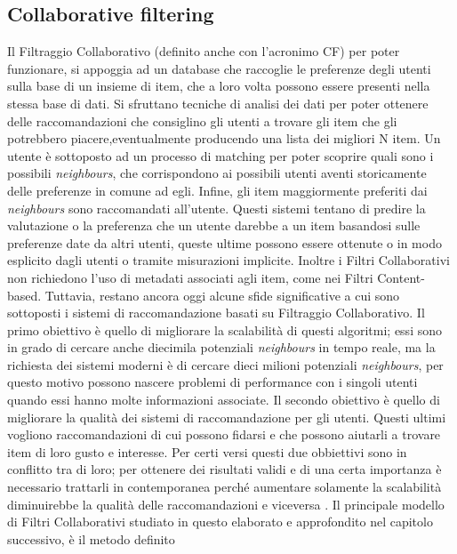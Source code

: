 \subsection{Collaborative filtering}
Il Filtraggio Collaborativo (definito anche con l'acronimo CF) per poter funzionare, si appoggia ad un database che raccoglie le 
preferenze degli utenti sulla base di un insieme di item, che a loro volta possono essere presenti nella stessa base di dati. 
Si sfruttano tecniche di analisi dei dati per poter ottenere delle raccomandazioni che consiglino gli utenti a trovare gli item 
che gli potrebbero piacere,eventualmente producendo una lista dei migliori N item.\hfill\break
Un utente è sottoposto ad un processo di matching per poter scoprire quali sono i possibili \textit{neighbours}, 
che corrispondono ai possibili utenti aventi storicamente delle preferenze in comune ad egli. Infine, gli item maggiormente 
preferiti dai \textit{neighbours} sono raccomandati all'utente.\hfill\break
Questi sistemi tentano di predire la valutazione o la preferenza che un utente darebbe a un item basandosi sulle preferenze date da altri 
utenti, queste ultime possono essere ottenute o in modo esplicito dagli utenti o tramite misurazioni implicite. 
Inoltre i Filtri Collaborativi non richiedono l'uso di metadati associati agli item, come nei Filtri Content-based.\hfill\break
Tuttavia, restano ancora oggi alcune sfide significative a cui sono sottoposti i sistemi di raccomandazione basati su 
Filtraggio Collaborativo.\hfill\break
Il primo obiettivo è quello di migliorare la scalabilità di questi algoritmi; essi sono in grado di cercare 
anche diecimila potenziali \textit{neighbours} in tempo reale, ma la richiesta dei sistemi moderni è di cercare dieci milioni 
potenziali \textit{neighbours}, per questo motivo possono nascere problemi di performance con i singoli utenti quando essi hanno 
molte informazioni associate.\hfill\break
Il secondo obiettivo è quello di migliorare la qualità dei sistemi di raccomandazione per gli utenti. Questi ultimi vogliono 
raccomandazioni di cui possono fidarsi e che possono aiutarli a trovare item di loro gusto e interesse. 
Per certi versi questi due obbiettivi sono in conflitto tra di loro; per ottenere dei risultati validi e di una certa importanza è 
necessario trattarli in contemporanea perché aumentare solamente la scalabilità diminuirebbe la qualità delle raccomandazioni e viceversa 
\cite{item-based-collaborative-filtering}.\hfill\break
Il principale modello di Filtri Collaborativi studiato in questo elaborato e approfondito nel capitolo successivo, è il metodo definito 
